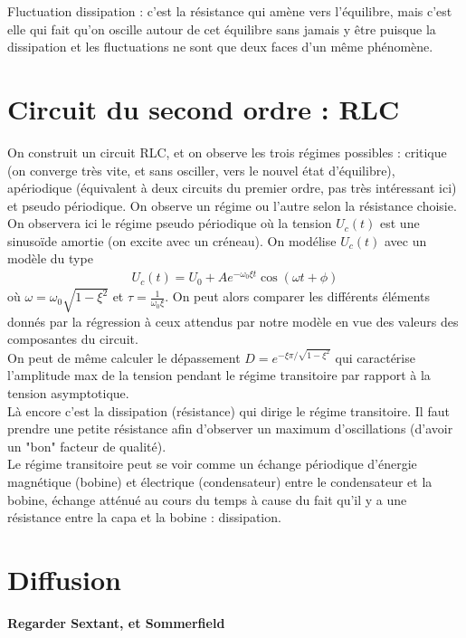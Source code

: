 \documentclass[12pt,prb,aps,epsf]{article}
\begin{document}
Fluctuation dissipation : c'est la résistance qui amène vers l'équilibre, mais c'est elle qui fait qu'on oscille autour de cet équilibre sans jamais y être puisque la dissipation et les fluctuations ne sont que deux faces d'un même phénomène.

\section{Circuit du second ordre : RLC}
On construit un circuit RLC, et on observe les trois régimes possibles : critique (on converge très vite, et sans osciller, vers le nouvel état d'équilibre), apériodique (équivalent à deux circuits du premier ordre, pas très intéressant ici) et pseudo périodique. On observe un régime ou l'autre selon la résistance choisie. \\

On observera ici le régime pseudo périodique où la tension $U_c(t)$ est une sinusoïde amortie (on excite avec un créneau). On modélise $U_c(t)$ avec un modèle du type 
\begin{eqnarray}
U_c(t) = U_0 + Ae^{-\omega_0\xi t}\cos(\omega t + \phi)
\end{eqnarray}
où $\omega = \omega_0 \sqrt{1-\xi^2}$ et $\tau = \frac{1}{\omega_0 \xi}$.
On peut alors comparer les différents éléments donnés par la régression à ceux attendus par notre modèle en vue des valeurs des composantes du circuit.\\

On peut de même calculer le dépassement $D = e^{-\xi\pi/\sqrt{1-\xi^2}}$ qui caractérise l'amplitude max de la tension pendant le régime transitoire par rapport à la tension asymptotique. \\

Là encore c'est la dissipation (résistance) qui dirige le régime transitoire. Il faut prendre une petite résistance afin d'observer un maximum d'oscillations (d'avoir un "bon" facteur de qualité).\\

Le régime transitoire peut se voir comme un échange périodique d'énergie magnétique (bobine) et électrique (condensateur) entre le condensateur et la bobine, échange atténué au cours du temps à cause du fait qu'il y a une résistance entre la capa et la bobine : dissipation.

\section{Diffusion}
\textbf{Regarder Sextant, et Sommerfield}
\end{document}
